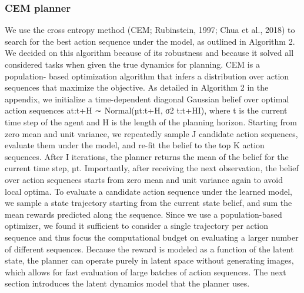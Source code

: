 \subsubsection{CEM planner}
We use the cross entropy method (CEM; Rubinstein, 1997; Chua et al., 2018) to search for the best action sequence under the model, as outlined in Algorithm 2. We decided on this algorithm because of its robustness and because it solved all considered tasks when given the true dynamics for planning. CEM is a population- based optimization algorithm that infers a distribution over action sequences that maximize the objective. As detailed in Algorithm 2 in the appendix, we initialize a time-dependent diagonal Gaussian belief over optimal action sequences at:t+H ∼ Normal(µt:t+H, σ2
t:t+HI), where t is the current
time step of the agent and H is the length of the planning horizon. Starting from zero mean and unit variance, we repeatedly sample J candidate action sequences, evaluate them under the model, and re-fit the belief to the top K action sequences. After I iterations, the planner returns the mean of the belief for the current time step, µt. Importantly, after receiving the next observation, the belief over action sequences starts from zero mean and unit variance again to avoid local optima.
To evaluate a candidate action sequence under the learned model, we sample a state trajectory starting from the current state belief, and sum the mean rewards predicted along the sequence. Since we use a population-based optimizer,
we found it sufficient to consider a single trajectory per action sequence and thus focus the computational budget on evaluating a larger number of different sequences. Because the reward is modeled as a function of the latent state, the planner can operate purely in latent space without generating images, which allows for fast evaluation of large batches of action sequences. The next section introduces the latent dynamics model that the planner uses.

